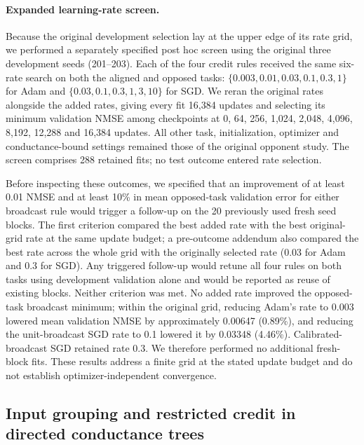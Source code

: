 \paragraph{Expanded learning-rate screen.}
Because the original development selection lay at the upper edge of its rate grid, we performed a separately specified post hoc screen using the original three development seeds (201--203). Each of the four credit rules received the same six-rate search on both the aligned and opposed tasks: $\{0.003,0.01,0.03,0.1,0.3,1\}$ for Adam and $\{0.03,0.1,0.3,1,3,10\}$ for SGD. We reran the original rates alongside the added rates, giving every fit 16,384 updates and selecting its minimum validation NMSE among checkpoints at 0, 64, 256, 1,024, 2,048, 4,096, 8,192, 12,288 and 16,384 updates. All other task, initialization, optimizer and conductance-bound settings remained those of the original opponent study. The screen comprises 288 retained fits; no test outcome entered rate selection.

Before inspecting these outcomes, we specified that an improvement of at least 0.01 NMSE and at least 10\% in mean opposed-task validation error for either broadcast rule would trigger a follow-up on the 20 previously used fresh seed blocks. The first criterion compared the best added rate with the best original-grid rate at the same update budget; a pre-outcome addendum also compared the best rate across the whole grid with the originally selected rate (0.03 for Adam and 0.3 for SGD). Any triggered follow-up would retune all four rules on both tasks using development validation alone and would be reported as reuse of existing blocks. Neither criterion was met. No added rate improved the opposed-task broadcast minimum; within the original grid, reducing Adam's rate to 0.003 lowered mean validation NMSE by approximately 0.00647 (0.89\%), and reducing the unit-broadcast SGD rate to 0.1 lowered it by 0.03348 (4.46\%). Calibrated-broadcast SGD retained rate 0.3. We therefore performed no additional fresh-block fits. These results address a finite grid at the stated update budget and do not establish optimizer-independent convergence.

\subsection{Input grouping and restricted credit in directed conductance trees}
\label{sec:conductance_grouping_bridge}

